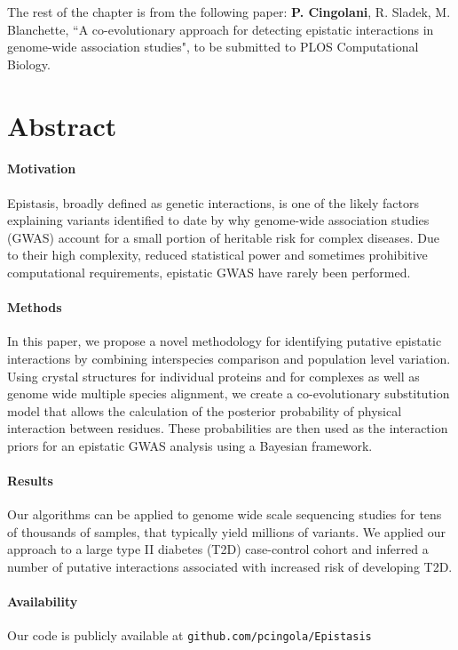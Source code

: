 The rest of the chapter is from the following paper: \textbf{P. Cingolani}, R. Sladek, M. Blanchette, ``A co-evolutionary approach for detecting epistatic interactions in genome-wide association studies", to be submitted to PLOS Computational Biology.

\section{Abstract}

\paragraph{Motivation} Epistasis, broadly defined as genetic interactions, is one of the likely factors explaining variants identified to date by why genome-wide association studies (GWAS) account for a small portion of heritable risk for complex diseases. Due to their high complexity, reduced statistical power and sometimes prohibitive computational requirements, epistatic GWAS have rarely been performed. 

\paragraph{Methods} In this paper, we propose a novel methodology for identifying putative epistatic interactions by combining interspecies comparison and population level variation. 
Using crystal structures for individual proteins and for complexes as well as genome wide multiple species alignment, we create a co-evolutionary substitution model that allows the calculation of the posterior probability of physical interaction between residues. 
These probabilities are then used as the interaction priors for an epistatic GWAS analysis using a Bayesian framework. 

\paragraph{Results} Our algorithms can be applied to genome wide scale sequencing studies for tens of thousands of samples, that typically yield millions of variants. 
We applied our approach to a large type II diabetes (T2D) case-control cohort and inferred a number of putative interactions associated with increased risk of developing T2D. 

\paragraph{Availability} Our code is publicly available at \texttt{github.com/pcingola/Epistasis}

